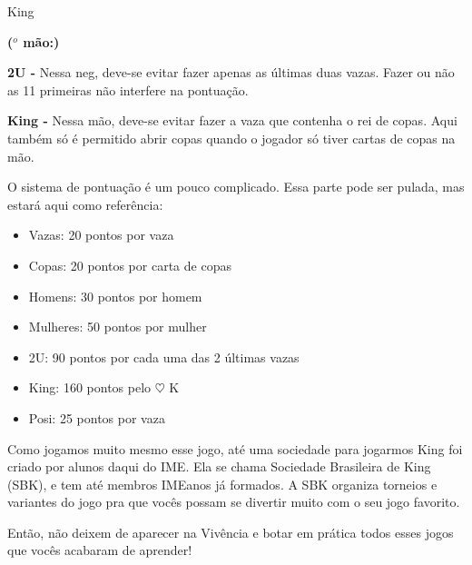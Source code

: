\begin{subsecao}{King}
\begin{list}{\textbf{ ($^{o}$ mão:)}}{}
\item \textbf{2U -} Nessa neg, deve-se evitar fazer apenas as últimas duas
vazas. Fazer ou não as 11 primeiras não interfere na pontuação.

\item \textbf{King -} Nessa mão, deve-se evitar fazer a vaza que contenha o rei
de copas. Aqui também só é permitido abrir copas quando o jogador só tiver
cartas de copas na mão.

\end{list}

O sistema de pontuação é um pouco complicado. Essa parte pode ser pulada, mas
estará aqui como referência:
\begin{itemize}

\item Vazas:	  20 pontos por vaza
\item Copas:	  20 pontos por carta de copas
\item Homens:	  30 pontos por homem
\item Mulheres: 50 pontos por mulher
\item 2U:	  90 pontos por cada uma das 2 últimas vazas
\item King:    160 pontos pelo $\heartsuit$ K
\item Posi:	  25 pontos por vaza

\end{itemize}
Como jogamos muito mesmo esse jogo, até uma sociedade para jogarmos King foi
criado por alunos daqui do IME. Ela se chama Sociedade Brasileira de King (SBK),
e tem até membros IMEanos já formados. A SBK organiza torneios e variantes do
jogo pra que vocês possam se divertir muito com o seu jogo favorito.

Então, não deixem de aparecer na Vivência e botar em prática todos esses jogos
que vocês acabaram de aprender!

\end{subsecao}
